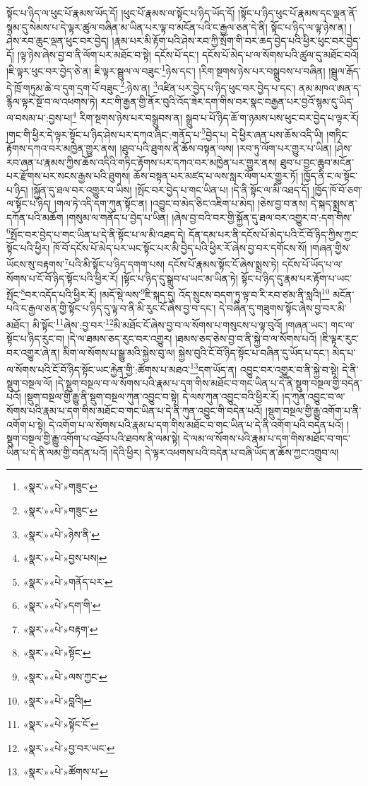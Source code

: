 སྟོང་པ་ཉིད་ལ་ཕུང་པོ་རྣམས་ཡོད་དོ། །ཕུང་པོ་རྣམས་ལ་སྟོང་པ་ཉིད་ཡོད་དོ། །སྟོང་པ་ཉིད་ཕུང་པོ་རྣམས་དང་ལྡན་ནོ་སྙམ་དུ་སེམས་པ་དེ་ལྟར་ཚུལ་བཞིན་མ་ཡིན་པར་ལྟ་བ་མངོན་པའི་ང་རྒྱལ་ཅན་དེ་ནི། སྟོང་པ་ཉིད་ལ་ལྟ་ཉེས་ན། །ཤེས་རབ་ཆུང་ལྡན་ཕུང་བར་བྱེད། །རྣམ་པར་མི་རྟོག་པའི་ཤེས་རབ་ཀྱི་སྲོག་གི་བར་ཆད་བྱེད་པའི་ཕྱིར་ཕུང་བར་བྱེད་དོ། །ལྟ་ཉེས་ཞེས་བྱ་བ་ནི་ལོག་པར་མཐོང་བ་སྟེ། དངོས་པོ་དང་། དངོས་པོ་མེད་པ་ལ་སོགས་པའི་ཚུལ་དུ་མཐོང་བའོ། །ཇི་ལྟར་ཕུང་བར་བྱེད་ཅེ་ན། ཇི་ལྟར་སྦྲུལ་ལ་བཟུང་\footnote{«སྣར་»«པེ་»གཟུང་}ཉེས་དང་། །རིག་སྔགས་ཉེས་པར་བསྒྲུབས་པ་བཞིན། །སྦྲུལ་རྒོད་དེ་ཁྲོ་གཏུམ་ཆེ་བ་དུག་དྲག་པོ་བཟུང་\footnote{«སྣར་»«པེ་»གཟུང་}:ཉེས་ན། \footnote{«སྣར་»«པེ་»ཉེས་ནི་}འཛིན་པར་བྱེད་པ་ཉིད་ཕུང་བར་བྱེད་པ་དང་། ནམ་མཁའ་ཨན་ད་རྙིལ་ལྟར་སྔོ་བ་ལ་འཕགས་ཏེ། རང་གི་རྒྱན་གྱི་ནོར་བུའི་འོད་ཟེར་དག་གིས་བར་སྣང་བརྒྱན་པར་བྱའོ་སྙམ་དུ་ཡིད་ལ་བསམ་པ་:བྱས་པ།\footnote{«སྣར་»«པེ་»བྱས་པས།} རིག་སྔགས་ཉེས་པར་བསྒྲུབས་ན། སྒྲུབ་པ་པོ་ཉིད་ཆོ་ག་ཉམས་པས་ཕུང་བར་བྱེད་པ་ལྟར་རོ། །གང་གི་ཕྱིར་དེ་ལྟར་སྟོང་པ་ཉིད་ཤེས་པར་དཀའ་ཞིང་:གནོད་པ་\footnote{«སྣར་»«པེ་»གནོད་པར་}བྱེད་པ། དེ་ཕྱིར་ཞན་པས་ཆོས་འདི་ཡི། །གཏིང་རྟོགས་དཀའ་བར་མཁྱེན་གྱུར་ནས། །ཐུབ་པའི་ཐུགས་ནི་ཆོས་བསྟན་ལས། །རབ་ཏུ་ལོག་པར་གྱུར་པ་ཡིན། །ཤེས་རབ་ཞན་པ་རྣམས་ཀྱིས་ཆོས་འདིའི་གཏིང་རྟོགས་པར་དཀའ་བར་མཁྱེན་པར་གྱུར་ནས། ཐུབ་པ་བྱང་ཆུབ་མངོན་པར་རྫོགས་པར་སངས་རྒྱས་པའི་ཐུགས། ཆོས་བསྟན་པར་མཛད་པ་ལས་སླར་ལོག་པར་གྱུར་ཏོ། །ཁྱོད་ནི་ང་ལ་སྟོང་པ་ཉིད། །སྐྱོན་དུ་ཐལ་བར་འགྱུར་བ་ཡིས། །སྤོང་བར་བྱེད་པ་གང་ཡིན་པ། །དེ་ནི་སྟོང་ལ་མི་འཐད་དོ། །ཁྱོད་ཁོ་བོ་ཅག་ལ་སྟོང་པ་ཉིད། །གལ་ཏེ་འདི་དག་ཀུན་སྟོང་ན། །འབྱུང་བ་མེད་ཅིང་འཇིག་པ་མེད། །ཅེས་བྱ་བ་ནས། དེ་སྐད་སྨྲས་ན་དཀོན་པའི་མཆོག །གསུམ་ལ་གནོད་པ་བྱེད་པ་ཡིན། །ཞེས་བྱ་བའི་བར་གྱི་སྐྱོན་དུ་ཐལ་བར་འགྱུར་བ་:དག་གིས་\footnote{«སྣར་»«པེ་»དག་གི་}སྤོང་བར་བྱེད་པ་གང་ཡིན་པ་དེ་ནི་སྟོང་པ་ལ་མི་འཐད་དེ། དོན་དམ་པར་ནི་དངོས་པོ་མེད་པའི་ངོ་བོ་ཉིད་ཀྱིས་ཀྱང་སྟོང་པའི་ཕྱིར། ཁོ་བོ་དངོས་པོ་མེད་པར་ཡང་སྟོང་པར་མི་བྱེད་པའི་ཕྱིར་རོ་ཞེས་བྱ་བར་དགོངས་སོ། །གཞན་གྱིས་ཡོངས་སུ་བརྟགས་\footnote{«སྣར་»«པེ་»བརྟག་}པའི་མི་སྟོང་པ་ཉིད་དགག་པས། དངོས་པོ་རྣམས་སྟོང་ངོ་ཞེས་སྨྲས་ཏེ། དངོས་པོ་ཡོད་པ་ལ་སོགས་པ་ངོ་བོ་ཉིད་སྟོང་པའི་ཕྱིར་རོ། །སྟོང་པ་ཉིད་དུ་སྒྲུབ་པ་ཡང་མ་ཡིན་ཏེ། སྟོང་པ་ཉིད་དུ་རྣམ་པར་རྟོག་པ་ཡང་སྤོང་\footnote{«སྣར་»«པེ་»སྟོང་}བར་འདོད་པའི་ཕྱིར་རོ། །མདོ་སྡེ་ལས་\footnote{«སྣར་»«པེ་»ལས་ཀྱང་}ཇི་སྐད་དུ། འོད་སྲུངས་བདག་ཏུ་ལྟ་བ་རི་རབ་ཙམ་ནི་སླའི།\footnote{«སྣར་»«པེ་»བླའི།} མངོན་པའི་ང་རྒྱལ་ཅན་གྱི་སྟོང་པ་ཉིད་དུ་ལྟ་བ་ནི་མི་རུང་ངོ་ཞེས་བྱ་བ་དང་། དེ་བཞིན་དུ་གཟུགས་སྟོང་ཞེས་བྱ་བར་མི་མཐོང་། མི་སྟོང་\footnote{«སྣར་»«པེ་»སྟོང་ངོ་}ཞེས་:བྱ་བར་\footnote{«སྣར་»«པེ་»བྱ་བར་ཡང་}མི་མཐོང་ངོ་ཞེས་བྱ་བ་ལ་སོགས་པ་གསུངས་པ་ལྟ་བུའོ། །གཞན་ཡང་། གང་ལ་སྟོང་པ་ཉིད་རུང་བ། །དེ་ལ་ཐམས་ཅད་རུང་བར་འགྱུར། །ཐམས་ཅད་ཅེས་བྱ་བ་ནི་སྐྱེ་བ་ལ་སོགས་པའོ། །ཇི་ལྟར་རུང་བར་འགྱུར་ཞེ་ན། མིག་ལ་སོགས་པ་སྒྱུ་མའི་སྐྱེས་བུ་ལ། སྐྱེས་བུའི་ངོ་བོ་ཉིད་སྟོང་པ་བཞིན་དུ་ཡོད་པ་དང་། མེད་པ་ལ་སོགས་པའི་ངོ་བོ་ཉིད་སྟོང་ཡང་རྐྱེན་གྱི་:ཚོགས་པ་མཐའ་\footnote{«སྣར་»«པེ་»ཚོགས་པ་}དག་ཡོད་ན། འབྱུང་བར་འགྱུར་བ་ནི་སྐྱེ་བ་སྟེ། དེ་ནི་སྡུག་བསྔལ་ལོ། །དེ་སྡུག་བསྔལ་བ་ལ་སོགས་པའི་རྣམ་པ་དག་གིས་མཐོང་བ་གང་ཡིན་པ་དེ་ནི་སྡུག་བསྔལ་གྱི་བདེན་པའོ། །སྡུག་བསྔལ་གྱི་རྒྱུ་ནི་སྡུག་བསྔལ་ཀུན་འབྱུང་བ་སྟེ། དེ་ལས་ཀུན་འབྱུང་བའི་ཕྱིར་རོ། །ད་ཀུན་འབྱུང་བ་ལ་སོགས་པའི་རྣམ་པ་དག་གིས་མཐོང་བ་གང་ཡིན་པ་དེ་ནི་ཀུན་འབྱུང་གི་བདེན་པའོ། །སྡུག་བསྔལ་གྱི་རྒྱུ་འགོག་པ་ནི་འགོག་པ་སྟེ། དེ་འགོག་པ་ལ་སོགས་པའི་རྣམ་པ་དག་གིས་མཐོང་བ་གང་ཡིན་པ་དེ་ནི་འགོག་པའི་བདེན་པའོ། །སྡུག་བསྔལ་གྱི་རྒྱུ་འགོག་པ་འཐོབ་པའི་ཐབས་ནི་ལམ་སྟེ། དེ་ལམ་ལ་སོགས་པའི་རྣམ་པ་དག་གིས་མཐོང་བ་གང་ཡིན་པ་དེ་ནི་ལམ་གྱི་བདེན་པའོ། །དེའི་ཕྱིར། དེ་ལྟར་འཕགས་པའི་བདེན་པ་བཞི་ཡོད་ན་ཆོས་ཀྱང་འགྲུབ་ལ། 